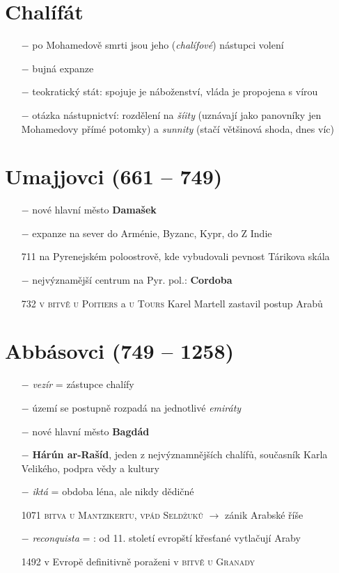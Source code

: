 \documentclass{article}
\begin{document}
\section*{Chalífát}
\begin{itemize}
    \vspace{-0.5em}
    \setlength\itemsep{0.15em}
    \item[$-$] po Mohamedově smrti jsou jeho (\textit{chalífové}) nástupci volení
    \item[$-$] bujná expanze
    \item[$-$] teokratický stát: spojuje je náboženství, vláda je propojena s vírou
    \item[$-$] otázka nástupnictví: rozdělení na \textit{šíity} (uznávají jako panovníky jen Mohamedovy přímé potomky) a \textit{sunnity} (stačí většinová shoda, dnes víc)
\end{itemize}

\section*{Umajjovci (661 -- 749)}
\begin{itemize}
    \vspace{-0.5em}
    \setlength\itemsep{0.15em}
    \item[$-$] nové hlavní město \textbf{Damašek}
    \item[$-$] expanze na sever do Arménie, Byzanc, Kypr, do Z Indie
    \item[711] na Pyrenejském poloostrově, kde vybudovali pevnost Tárikova skála
    \item[$-$] nejvýznamější centrum na Pyr. pol.: \textbf{Cordoba}
    \item[732] \textsc{v bitvě u Poitiers} a \textsc{u Tours} Karel Martell zastavil postup Arabů
\end{itemize}


\section*{Abbásovci (749 -- 1258)}
\begin{itemize}
    \vspace{-0.5em}
    \setlength\itemsep{0.15em}
    \item[$-$] \textit{vezír} = zástupce chalífy
    \item[$-$] území se postupně rozpadá na jednotlivé \textit{emiráty}
    \item[$-$] nové hlavní město \textbf{Bagdád}
    \item[$-$] \textbf{Hárún ar-Rašíd}, jeden z nejvýznamnějších chalífů, současník Karla Velikého, podpra vědy a kultury
    \item[$-$] \textit{iktá} = obdoba léna, ale nikdy dědičné
    \item[1071] \textsc{bitva u Mantzikertu, vpád Seldžuků} $\rightarrow$ zánik Arabské říše
    \item[$-$] \textit{reconquista} = : od 11. století evropští křesťané vytlačují Araby
    \item[1492] v Evropě definitivně poraženi v \textsc{bitvě u Granady}
\end{itemize}
\end{document}
